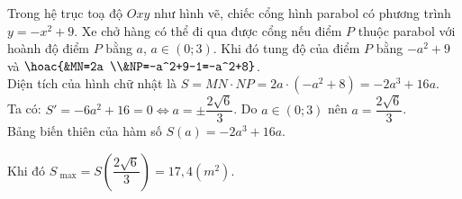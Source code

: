\begin{bt}
{\begin{center}
		\end{center}
		Trong hệ trục toạ độ $Oxy$ như hình vẽ, chiếc cổng hình parabol có phương trình $y=-x^2+9$. Xe chở hàng có thể đi qua được cổng nếu điểm $P$ thuộc parabol với hoành độ điểm $P$ bằng  $a$, $a\in(0;3)$. Khi đó tung độ của điểm $P$ bằng $-a^2+9$ và
		$  \hoac{&MN=2a \\&NP=-a^2+9-1=-a^2+8}$.\\
		Diện tích của hình chữ nhật  là $S=MN\cdot NP=2a\cdot(-a^2+8)=-2a^3+16a$.\\
		Ta có: $S'=-6a^2+16=0 \Leftrightarrow a=\pm\dfrac{2\sqrt{6}}{3}$. Do $a\in(0;3)$ nên $a=\dfrac{2\sqrt{6}}{3}$.\\ 
		Bảng biến thiên của hàm số  $S\left(a\right)=-2a^3+16a$.
		\begin{center}
		\end{center}
		Khi đó $S_{\text{ max}} = S\left(\dfrac{2\sqrt{6}}{3}\right)=17,4 \left(m^2\right)$. 
	 }
\end{bt}

